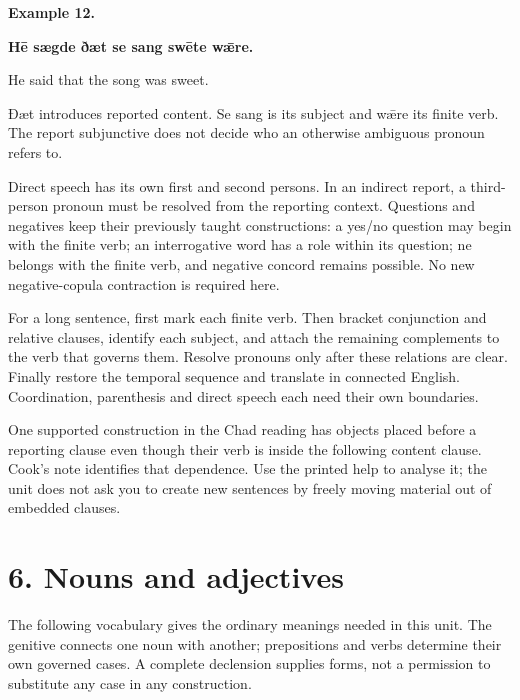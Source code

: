 \textbf{Example 12.}

\textbf{Hē sægde ðæt se sang swēte wǣre.}

He said that the song was sweet.

Ðæt introduces reported content. Se sang is its subject and wǣre its finite verb. The report subjunctive does not decide who an otherwise ambiguous pronoun refers to.

Direct speech has its own first and second persons. In an indirect report, a third-person pronoun must be resolved from the reporting context. Questions and negatives keep their previously taught constructions: a yes/\allowbreak{}no question may begin with the finite verb; an interrogative word has a role within its question; ne belongs with the finite verb, and negative concord remains possible. No new negative-copula contraction is required here.

For a long sentence, first mark each finite verb. Then bracket conjunction and relative clauses, identify each subject, and attach the remaining complements to the verb that governs them. Resolve pronouns only after these relations are clear. Finally restore the temporal sequence and translate in connected English. Coordination, parenthesis and direct speech each need their own boundaries.

One supported construction in the Chad reading has objects placed before a reporting clause even though their verb is inside the following content clause. Cook’s note identifies that dependence. Use the printed help to analyse it; the unit does not ask you to create new sentences by freely moving material out of embedded clauses.

\section*{6. Nouns and adjectives}

The following vocabulary gives the ordinary meanings needed in this unit. The genitive connects one noun with another; prepositions and verbs determine their own governed cases. A complete declension supplies forms, not a permission to substitute any case in any construction.

